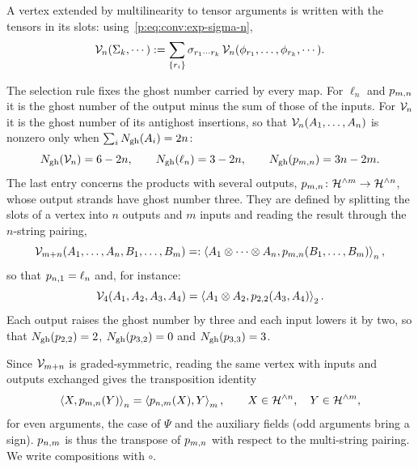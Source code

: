 A vertex extended by multilinearity to tensor arguments is written with the tensors in its slots: using~\eqref{p:eq:conv:exp-sigma-n},
\begin{equation}
  \vertex{n}(\Sigma_k, \cdots)
    := \sum_{\{ r_i \}} \sigma_{r_1 \cdots r_k} \, \vertex{n}(\phi_{r_1}, \ldots, \phi_{r_k}, \cdots).
\end{equation}

The selection rule fixes the ghost number carried by every map.
For $\ell_n$ and $\sprod{m}{n}$ it is the ghost number of the output minus the sum of those of the inputs.
For $\vertex{n}$ it is the ghost number of its antighost insertions, so that $\vertex{n}(A_1, \ldots, A_n)$ is nonzero only when $\sum_i \Ngh(A_i) = 2n$:
\begin{equation}
  \label{p:eq:conv:ghost-numbers}
  \Ngh(\vertex{n})
    = 6 - 2n,
  \qquad
  \Ngh(\ell_n)
    = 3 - 2n,
  \qquad
  \Ngh(\sprod{m}{n})
    = 3n - 2m.
\end{equation}
The last entry concerns the products with several outputs, $\sprod{m}{n} \colon \Hn{m} \to \Hn{n}$, whose output strands have ghost number three.
They are defined by splitting the slots of a vertex into $n$ outputs and $m$ inputs and reading the result through the $n$-string pairing,
\begin{equation}
  \label{p:eq:conv:sprod}
  \vertex{m+n}(A_1, \ldots, A_n, B_1, \ldots, B_m)
    =: \pair[n]{A_1 \otimes \cdots \otimes A_n}{\sprod{m}{n}(B_1, \ldots, B_m)},
\end{equation}
so that $\sprod{n}{1} = \ell_n$ and, for instance:
\begin{equation*}
  \vertex{4}(A_1, A_2, A_3, A_4)
    = \pair[2]{A_1 \otimes A_2}{\sprod{2}{2}(A_3, A_4)}.
\end{equation*}
Each output raises the ghost number by three and each input lowers it by two, so that $\Ngh(\sprod{2}{2}) = 2$, $\Ngh(\sprod{3}{2}) = 0$ and $\Ngh(\sprod{3}{3}) = 3$.

Since $\vertex{m+n}$ is graded-symmetric, reading the same vertex with inputs and outputs exchanged gives the transposition identity
\begin{equation}
  \label{p:eq:conv:transpose}
  \pair[n]{X}{\sprod{m}{n}(Y)}
    = \pair[m]{\sprod{n}{m}(X)}{Y},
  \qquad
  X \in \Hn{n},
  \quad
  Y \in \Hn{m},
\end{equation}
for even arguments, the case of $\Psi$ and the auxiliary fields (odd arguments bring a sign).
$\sprod{n}{m}$ is thus the transpose of $\sprod{m}{n}$ with respect to the multi-string pairing.
We write compositions with $\circ$.

